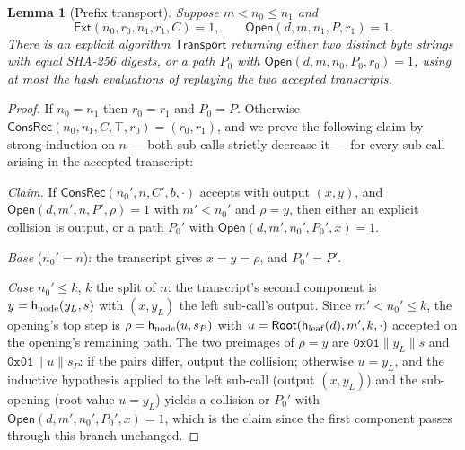 \documentclass[11pt]{article}
\newtheorem{lemma}{Lemma}
\theoremstyle{remark}
\newcommand{\hleaf}{\mathsf{h}_{\rm leaf}}
\newcommand{\hnode}{\mathsf{h}_{\rm node}}
\newcommand{\Root}{\mathsf{Root}}
\newcommand{\ConsRec}{\mathsf{ConsRec}}
\begin{document}
\begin{samepage}
\begin{lemma}[Prefix transport]\label{lem:transport}
Suppose $m<n_0\le n_1$ and
\[\mathsf{Ext}(n_0,r_0,n_1,r_1,C)=1, \qquad \mathsf{Open}(d,m,n_1,P,r_1)=1.\]
There is an explicit algorithm $\mathsf{Transport}$ returning either two
distinct byte strings with equal SHA-256 digests, or a path $P_0$ with
$\mathsf{Open}(d,m,n_0,P_0,r_0)=1$, using at most the hash evaluations of
replaying the two accepted transcripts.
\end{lemma}
\end{samepage}
\begin{proof}
If $n_0=n_1$ then $r_0=r_1$ and $P_0=P$. Otherwise
$\ConsRec(n_0,n_1,C,\top,r_0)=(r_0,r_1)$, and we prove the following claim by
strong induction on $n$ --- both sub-calls strictly decrease it --- for every
sub-call arising in the accepted transcript:

\emph{Claim.} If $\ConsRec(n_0',n,C',b,\cdot)$ accepts with output $(x,y)$,
and $\mathsf{Open}(d,m',n,P',\rho)=1$ with $m'<n_0'$ and $\rho=y$, then
either an explicit collision is output, or a path $P_0'$ with
$\mathsf{Open}(d,m',n_0',P_0',x)=1$.

\emph{Base} ($n_0'=n$): the transcript gives $x=y=\rho$, and $P_0'=P'$.

\emph{Case} $n_0'\le k$, $k$ the split of $n$: the transcript's second
component is $y=\hnode(y_L,s)$ with $(x,y_L)$ the left sub-call's output.
Since $m'<n_0'\le k$, the opening's top step is
$\rho=\hnode(u,s_P)$ with $u=\Root(\hleaf(d),m',k,\cdot)$ accepted on the
opening's remaining path. The two preimages of $\rho=y$ are
$\mathtt{0x01}\|y_L\|s$ and $\mathtt{0x01}\|u\|s_P$: if the pairs differ,
output the collision; otherwise $u=y_L$, and the inductive hypothesis applied
to the left sub-call (output $(x,y_L)$) and the sub-opening (root value
$u=y_L$) yields a collision or $P_0'$ with
$\mathsf{Open}(d,m',n_0',P_0',x)=1$, which is the claim since the first
component passes through this branch unchanged.


\end{proof}
\end{document}
